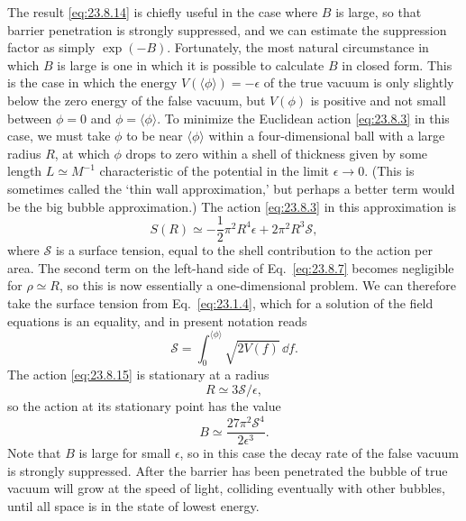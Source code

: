 The result \eqref{eq:23.8.14} is chiefly useful in the case where $B$ is large, so that barrier penetration is strongly suppressed, and we can estimate the suppression factor as simply $\exp(-B)$. Fortunately, the most natural circumstance in which $B$ is large is one in which it is possible to calculate $B$ in closed form. This is the case in which the energy $V(\langle\phi\rangle)=-\epsilon$ of the true vacuum is only slightly below the zero energy of the false vacuum, but $V(\phi)$ is positive and not small between $\phi=0$ and $\phi=\langle\phi\rangle$. To minimize the Euclidean action \eqref{eq:23.8.3} in this case, we must take $\phi$ to be near $\langle\phi\rangle$ within a four-dimensional ball with a large radius $R$, at which $\phi$ drops to zero within a shell of thickness given by some length $L\simeq M^{-1}$ characteristic of the potential in the limit $\epsilon\to0$. (This is sometimes called the `thin wall approximation,' but perhaps a better term would be the big bubble approximation.) The action \eqref{eq:23.8.3} in this approximation is
\begin{equation}
 S(R)\simeq-\frac{1}{2}\pi^2R^4\epsilon+2\pi^2R^3\mathcal S,
 \tag{23.8.15}\label{eq:23.8.15}
\end{equation}
where $\mathcal S$ is a surface tension, equal to the shell contribution to the action per area. The second term on the left-hand side of Eq.~\eqref{eq:23.8.7} becomes negligible for $\rho\simeq R$, so this is now essentially a one-dimensional problem. We can therefore take the surface tension from Eq.~\eqref{eq:23.1.4}, which for a solution of the field equations is an equality, and in present notation reads
\begin{equation}
 \mathcal S=\int_0^{\langle\phi\rangle}\sqrt{2V(f)}\,\dd f.
 \tag{23.8.16}\label{eq:23.8.16}
\end{equation}
The action \eqref{eq:23.8.15} is stationary at a radius
\begin{equation}
 R\simeq3\mathcal S/\epsilon,
 \tag{23.8.17}\label{eq:23.8.17}
\end{equation}
so the action at its stationary point has the value
\begin{equation}
 B\simeq\frac{27\pi^2\mathcal S^4}{2\epsilon^3}.
 \tag{23.8.18}\label{eq:23.8.18}
\end{equation}
Note that $B$ is large for small $\epsilon$, so in this case the decay rate of the false vacuum is strongly suppressed. After the barrier has been penetrated the bubble of true vacuum will grow at the speed of light, colliding eventually with other bubbles, until all space is in the state of lowest energy.
